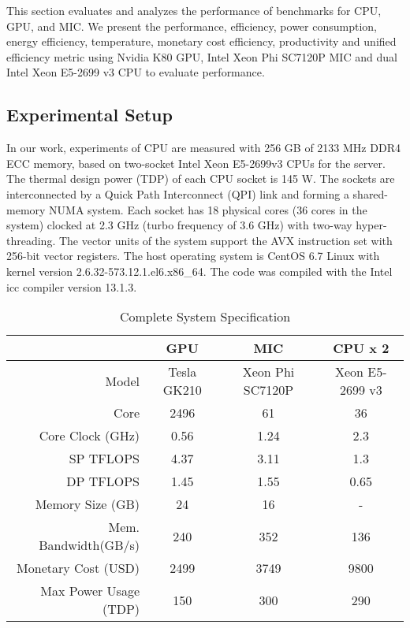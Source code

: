
This section evaluates and analyzes the performance of benchmarks for CPU, GPU, and MIC. We present the performance, efficiency, power consumption, energy efficiency, temperature, monetary cost efficiency, productivity and unified efficiency metric using Nvidia K80 GPU, Intel Xeon Phi SC7120P MIC and dual Intel Xeon E5-2699 v3 CPU to evaluate performance. 


\subsection{Experimental Setup}
In our work, experiments of CPU are measured with 256 GB of 2133 MHz DDR4 ECC memory, based on two-socket Intel Xeon E5-2699v3 CPUs for the server. The thermal design power (TDP) of each CPU socket is 145 W. The sockets are interconnected by a Quick Path Interconnect (QPI) link and forming a shared-memory NUMA system. Each socket has 18 physical cores (36 cores in the system) clocked at 2.3 GHz (turbo frequency of 3.6 GHz) with two-way hyper-threading. The vector units of the system support the AVX instruction set with 256-bit vector registers. The host operating system is CentOS 6.7 Linux with kernel version 2.6.32-573.12.1.el6.x86\_64. The code was compiled with the Intel icc compiler version 13.1.3.


\begin{table}[htbp]
  \centering
      \caption{Complete System Specification}
    \begin{adjustbox}{width=0.5\textwidth}
    \begin{tabular}{rccc}
    \toprule
          & GPU   & MIC   & CPU x 2 \\
    \midrule
    Model & Tesla GK210 & Xeon Phi SC7120P & Xeon E5-2699 v3 \\
    Core  & 2496  & 61    & 36 \\
    Core Clock (GHz) & 0.56  & 1.24  & 2.3 \\
    SP TFLOPS & 4.37  & 3.11  & 1.3 \\
    DP TFLOPS & 1.45  & 1.55  & 0.65 \\
    Memory Size (GB) & 24    & 16    & - \\
    Mem. Bandwidth(GB/s) & 240   & 352   & 136 \\
    Monetary Cost (USD) & 2499  & 3749  & 9800 \\
    Max Power Usage (TDP) & 150   & 300   & 290 \\
    \bottomrule
    \end{tabular}%
    \label{tab:specification}
    \end{adjustbox}

\end{table}%

